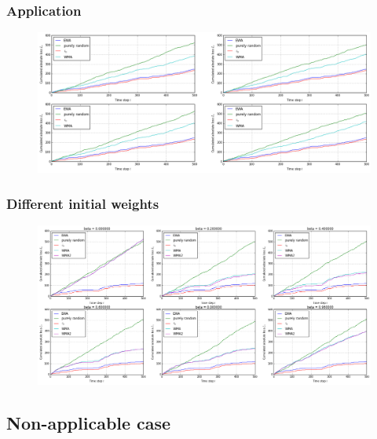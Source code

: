 \documentclass{beamer}
\begin{document}
\begin{frame}
	\frametitle{Application }
	\begin{figure}
		\includegraphics[scale=0.25]{download.png}
	\end{figure}
\end{frame}
\begin{frame}
	\frametitle{Different initial weights }
	\begin{figure}
		\includegraphics[scale=0.25]{download2.png}
	\end{figure}
\end{frame}

		\subsection{Non-applicable case}
\end{document}

